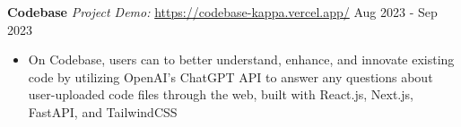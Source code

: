 \documentclass[a4paper,10pt]{extarticle}
\begin{document}
\noindent
\textbf{Codebase} %
\textit{Project Demo:} \url{https://codebase-kappa.vercel.app/} \hfill Aug 2023 - Sep 2023 %
\begin{itemize}
    \item On Codebase, users can to better understand, enhance, and innovate existing code by utilizing OpenAI's ChatGPT API to answer any questions about user-uploaded code files through the web, built with React.js, Next.js, FastAPI, and TailwindCSS %
  \end{itemize}

\end{document}
